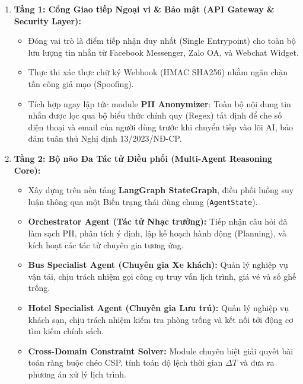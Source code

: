 \begin{enumerate}
    \item \textbf{Tầng 1: Cổng Giao tiếp Ngoại vi \& Bảo mật (API Gateway \& Security Layer):}
    \begin{itemize}
        \item Đóng vai trò là điểm tiếp nhận duy nhất (Single Entrypoint) cho toàn bộ lưu lượng tin nhắn từ Facebook Messenger, Zalo OA, và Webchat Widget.
        \item Thực thi xác thực chữ ký Webhook (HMAC SHA256) nhằm ngăn chặn tấn công giả mạo (Spoofing).
        \item Tích hợp ngay lập tức module \textbf{PII Anonymizer}: Toàn bộ nội dung tin nhắn được lọc qua bộ biểu thức chính quy (Regex) tất định để che số điện thoại và email của người dùng trước khi chuyển tiếp vào lõi AI, bảo đảm tuân thủ Nghị định 13/2023/NĐ-CP.
    \end{itemize}

    \item \textbf{Tầng 2: Bộ não Đa Tác tử Điều phối (Multi-Agent Reasoning Core):}
    \begin{itemize}
        \item Xây dựng trên nền tảng \textbf{LangGraph StateGraph}, điều phối luồng suy luận thông qua một Biến trạng thái dùng chung (\texttt{AgentState}).
        \item \textbf{Orchestrator Agent (Tác tử Nhạc trưởng):} Tiếp nhận câu hỏi đã làm sạch PII, phân tích ý định, lập kế hoạch hành động (Planning), và kích hoạt các tác tử chuyên gia tương ứng.
        \item \textbf{Bus Specialist Agent (Chuyên gia Xe khách):} Quản lý nghiệp vụ vận tải, chịu trách nhiệm gọi công cụ truy vấn lịch trình, giá vé và số ghế trống.
        \item \textbf{Hotel Specialist Agent (Chuyên gia Lưu trú):} Quản lý nghiệp vụ khách sạn, chịu trách nhiệm kiểm tra phòng trống và kết nối tới động cơ tìm kiếm chính sách.
        \item \textbf{Cross-Domain Constraint Solver:} Module chuyên biệt giải quyết bài toán ràng buộc chéo CSP, tính toán độ lệch thời gian $\Delta T$ và đưa ra phương án xử lý lịch trình.
    \end{itemize}


\end{enumerate}
